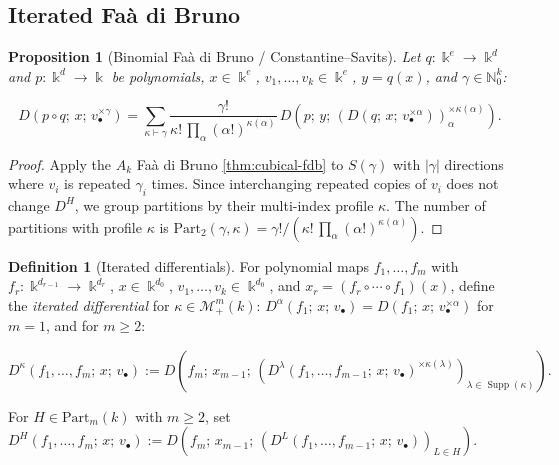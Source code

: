 \documentclass[10pt,a4paper]{article}
\theoremstyle{plain}
\newtheorem{proposition}[theorem]{Proposition}
\theoremstyle{definition}
\newtheorem{definition}[theorem]{Definition}
\newcommand{\IN}{\mathbb{N}} %
\newcommand{\ik}{\Bbbk} %
\newcommand{\1}{\mathbb{1}} %
\newcommand{\KM}{\mathcal{M}} %
\newcommand{\Part}{\mathrm{Part}} %
\DeclareMathOperator{\supp}{\mathrm{Supp}} %
\begin{document}
\subsection{Iterated Faà di Bruno}\label{iterated-fauxe0-di-bruno-1}

\begin{proposition}[Binomial Faà di Bruno / Constantine--Savits]

\label{prop:poly-fdb} Let \(q: \ik^e \to \ik^d\) and
\(p: \ik^d \to \ik\) be polynomials, \(x \in \ik^e\),
\(v_1, \dots, v_k \in \ik^e\), \(y = q(x)\), and \(\gamma \in \IN_0^k\):

\[
  D(p \circ q;\, x;\, v_\bullet^{\times \gamma}) = \sum_{\kappa \vdash \gamma} \frac{\gamma!}{\kappa!\, \prod_\alpha (\alpha!)^{\kappa(\alpha)}}\, D(p;\, y;\, (D(q;\, x;\, v_\bullet^{\times \alpha}))_\alpha^{\times \kappa(\alpha)}).
\]

\end{proposition}

\begin{proof}

Apply the \(A_k\) Faà di Bruno \ref{thm:cubical-fdb} to \(S(\gamma)\)
with \(|\gamma|\) directions where \(v_i\) is repeated \(\gamma_i\)
times. Since interchanging repeated copies of \(v_i\) does not change
\(D^H\), we group partitions by their multi-index profile \(\kappa\).
The number of partitions with profile \(\kappa\) is
\(\Part_2(\gamma, \kappa) = \gamma! / (\kappa!\, \prod_\alpha (\alpha!)^{\kappa(\alpha)})\).

\end{proof}

\begin{definition}[Iterated differentials]

\label{def:poly-iterated-diff} For polynomial maps \(f_1, \dots, f_m\)
with \(f_r: \ik^{d_{r-1}} \to \ik^{d_r}\), \(x \in \ik^{d_0}\),
\(v_1, \dots, v_k \in \ik^{d_0}\), and
\(x_r = (f_r \circ \cdots \circ f_1)(x)\), define the \emph{iterated
differential} for \(\kappa \in \KM_+^m(k)\):
\(D^\alpha(f_1;\, x;\, v_\bullet) = D(f_1;\, x;\, v_\bullet^{\times \alpha})\)
for \(m = 1\), and for \(m \geq 2\):

\[
  D^\kappa(f_1, \dots, f_m;\, x;\, v_\bullet) := D(f_m;\, x_{m-1};\, (D^\lambda(f_1, \dots, f_{m-1};\, x;\, v_\bullet)^{\times \kappa(\lambda)})_{\lambda \in \supp(\kappa)}).
\]

For \(H \in \Part_m(k)\) with \(m \geq 2\), set
\(D^H(f_1, \dots, f_m;\, x;\, v_\bullet) := D(f_m;\, x_{m-1};\, (D^L(f_1, \dots, f_{m-1};\, x;\, v_\bullet))_{L \in H})\).

\end{definition}
\end{document}
